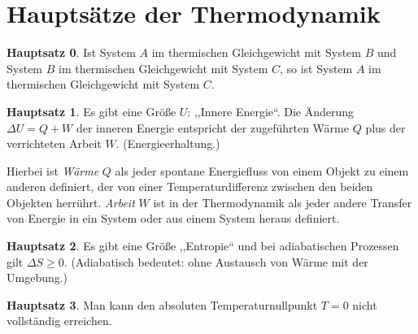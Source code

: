 \section*{Hauptsätze der Thermodynamik}

\begin{center}
\parbox[c][5cm][c]{14cm}{\begin{tcolorbox}[colback=banana,arc=0cm,frame hidden,enhanced]{\textbf{Hauptsatz 0}. Ist System $A$ im thermischen Gleichgewicht mit System $B$ und System $B$ im thermischen Gleichgewicht mit System $C$, so ist System $A$ im thermischen Gleichgewicht mit System $C$.}\end{tcolorbox}}
\end{center}
\begin{center}
\parbox[c][5cm][c]{14cm}{\begin{tcolorbox}[colback=banana,arc=0cm,frame hidden,enhanced]{\textbf{Hauptsatz 1}. Es gibt eine Größe $U$: ,,Innere Energie``. Die Änderung $\Delta U = Q+W$ der inneren Energie entspricht der zugeführten Wärme $Q$ plus der verrichteten Arbeit $W$. (Energieerhaltung.)}\end{tcolorbox}}
\end{center}
Hierbei ist \emph{Wärme} $Q$ als jeder spontane Energiefluss von einem Objekt zu einem anderen definiert, der von einer Temperaturdifferenz zwischen den beiden Objekten herrührt. \emph{Arbeit} $W$ ist in der Thermodynamik als jeder andere Transfer von Energie in ein System oder aus einem System heraus definiert. 
\begin{center}
\parbox[c][5cm][c]{14cm}{\begin{tcolorbox}[colback=banana,arc=0cm,frame hidden,enhanced]{\textbf{Hauptsatz 2}. Es gibt eine Größe ,,Entropie`` und bei adiabatischen Prozessen gilt $\Delta S \ge 0$. (Adiabatisch bedeutet: ohne Austausch von Wärme mit der Umgebung.)}\end{tcolorbox}}
\end{center}
\begin{center}
\parbox[c][5cm][c]{14cm}{\begin{tcolorbox}[colback=banana,arc=0cm,frame hidden,enhanced]{\textbf{Hauptsatz 3}. Man kann den absoluten Temperaturnullpunkt $T=0$ nicht vollständig erreichen.}\end{tcolorbox}}
\end{center}
 



